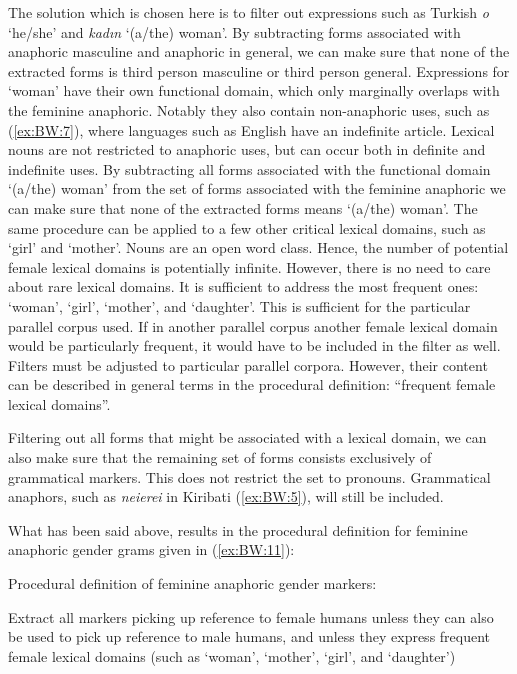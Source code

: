 \documentclass[output=collectionpaper]{langsci/langscibook}
\begin{document}
The solution which is chosen here is to filter out expressions such as Turkish \textit{o} ‘he/she’ and \textit{kadın} ‘(a/the) woman’. By subtracting forms associated with anaphoric masculine and anaphoric in general, we can make sure that none of the extracted forms is third person masculine or third person general. Expressions for ‘woman’ have their own functional domain, which only marginally overlaps with the feminine anaphoric. Notably they also contain non-anaphoric uses, such as (\ref{ex:BW:7}), where languages such as English have an indefinite article. Lexical nouns are not restricted to anaphoric uses, but can occur both in definite and indefinite uses. By subtracting all forms associated with the functional domain ‘(a/the) woman’ from the set of forms associated with the feminine anaphoric we can make sure that none of the extracted forms means ‘(a/the) woman’. The same procedure can be applied to a few other critical lexical domains, such as ‘girl’ and ‘mother’. Nouns are an open word class. Hence, the number of potential female lexical domains is potentially infinite. However, there is no need to care about rare lexical domains. It is sufficient to address the most frequent ones: ‘woman’, ‘girl’, ‘mother’, and ‘daughter’. This is sufficient for the particular parallel corpus used. If in another parallel corpus another female lexical domain would be particularly frequent, it would have to be included in the filter as well. Filters must be adjusted to particular parallel corpora. However, their content can be described in general terms in the procedural definition: “frequent female lexical domains”.

Filtering out all forms that might be associated with a lexical domain, we can also make sure that the remaining set of forms consists exclusively of grammatical markers. This does not restrict the set to pronouns. Grammatical anaphors, such as \textit{neierei} in Kiribati (\ref{ex:BW:5}), will still be included.

What has been said above, results in the procedural definition for feminine anaphoric gender grams given in (\ref{ex:BW:11}):

\ea\label{ex:BW:11}
Procedural definition of feminine anaphoric gender markers:\\
\begin{xlist}
\ex Extract all markers picking up reference to female humans
\ex unless they can also be used to pick up reference to male humans, and
\ex unless they express frequent female lexical domains (such as ‘woman’, ‘mother’, ‘girl’, and ‘daughter’)
\end{xlist}
\z
\end{document}

